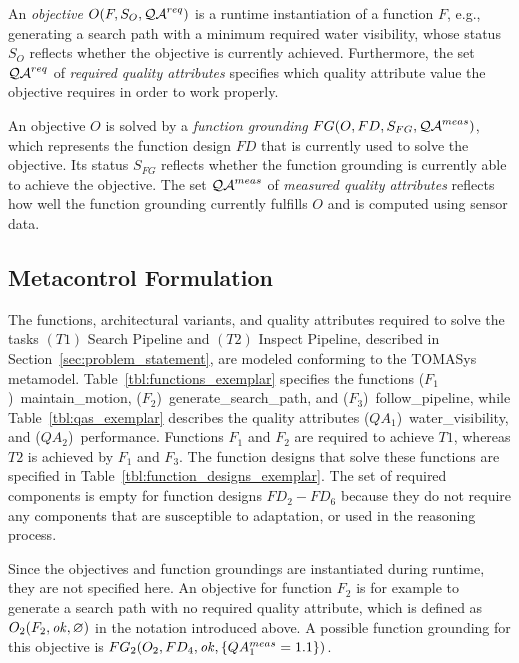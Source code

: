 An \emph{objective} $O(F,S_O,\operatorname{\mathcal{QA}}^{req})$ is a runtime instantiation of a function $F$, e.g., generating a search path with a minimum required water visibility, whose status $S_O$ reflects whether the objective is currently achieved. Furthermore, the set $\operatorname{\mathcal{QA}}^{req}$ of \emph{required quality attributes} specifies which quality attribute value the objective requires in order to work properly.

An objective $O$ is solved by a \emph{function grounding} $FG(O,FD,S_{FG}, \operatorname{\mathcal{QA}}^{meas})$, which represents the function design $FD$ that is currently used to solve the objective.
Its status $S_{FG}$ reflects whether the function grounding is currently able to achieve the objective. The set $\operatorname{\mathcal{QA}}^{meas}$ of \emph{measured quality attributes} reflects how well the function grounding currently fulfills $O$ and is computed using sensor data.


\subsection{Metacontrol Formulation}\label{sec:metacontrol_formulation}
The functions, architectural variants, and quality attributes required to solve the tasks $(T1)$ Search Pipeline and $(T2)$ Inspect Pipeline, described in Section~\ref{sec:problem_statement}, are modeled conforming to the TOMASys metamodel. Table~\ref{tbl:functions_exemplar} specifies the functions ($F_1$)~maintain\_motion, ($F_2$)~generate\_search\_path, and ($F_3$)~follow\_pipeline, while Table~\ref{tbl:qas_exemplar} describes the quality attributes ($QA_1$)~water\_visibility, and ($QA_2$)~performance.
Functions $F_1$ and $F_2$ are required to achieve $T1$, whereas $T2$ is achieved by $F_1$ and $F_3$.
The function designs that solve these functions are specified in Table~\ref{tbl:function_designs_exemplar}. The set of required components is empty for function designs $FD_2 - FD_6$ because they do not require any components that are susceptible to adaptation, or used in the reasoning process.

Since the objectives and function groundings are instantiated during runtime, they are not specified here. An objective for function $F_2$ is for example to generate a search path with no required quality attribute, which is defined as $O_2(F_2, \text{\emph{ok}}, \varnothing)$ in the notation introduced above. A possible function grounding for this objective is $FG_2(O_2, FD_4, \text{\emph{ok}}, \{QA_1^{meas}=1.1\})$.


